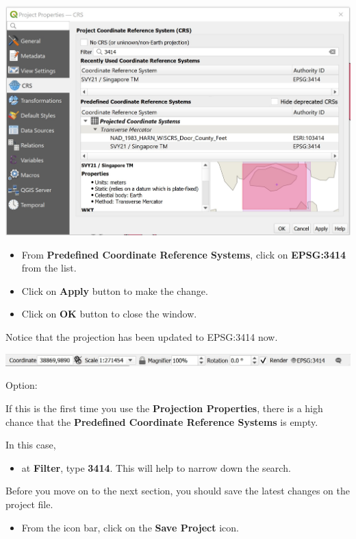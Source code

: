 \documentclass[
  letterpaper,
  DIV=11,
  numbers=noendperiod]{scrreprt}
\providecommand{\tightlist}{%
  \setlength{\itemsep}{0pt}\setlength{\parskip}{0pt}}\usepackage{longtable,booktabs,array}
\begin{document}
\includegraphics{./img02/image10.jpg}

\begin{itemize}
\tightlist
\item
  From \textbf{Predefined Coordinate Reference Systems}, click on
  \textbf{EPSG:3414} from the list.
\item
  Click on \textbf{Apply} button to make the change.
\item
  Click on \textbf{OK} button to close the window.
\end{itemize}

Notice that the projection has been updated to EPSG:3414 now.

\includegraphics{./img02/image11.jpg}

Option:

If this is the first time you use the \textbf{Projection Properties},
there is a high chance that the \textbf{Predefined Coordinate Reference
Systems} is empty.

In this case,

\begin{itemize}
\tightlist
\item
  at \textbf{Filter}, type \textbf{3414}. This will help to narrow down
  the search.
\end{itemize}

Before you move on to the next section, you should save the latest
changes on the project file.

\begin{itemize}
\tightlist
\item
  From the icon bar, click on the \textbf{Save Project} icon.
\end{itemize}
\end{document}
